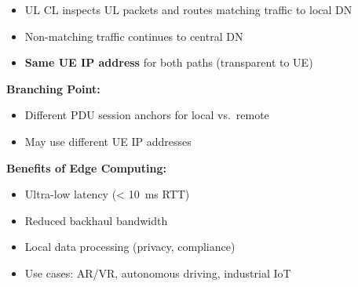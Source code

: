 
\begin{itemize}
\tightlist
\item
  UL CL inspects UL packets and routes matching traffic to local DN
\item
  Non-matching traffic continues to central DN
\item
  \textbf{Same UE IP address} for both paths (transparent to UE)
\end{itemize}


\textbf{Branching Point:}


\begin{itemize}
\tightlist
\item
  Different PDU session anchors for local vs. remote
\item
  May use different UE IP addresses
\end{itemize}

\textbf{Benefits of Edge Computing:}

\begin{itemize}
\tightlist
\item
  Ultra-low latency (\textless{} 10~ms RTT)
\item
  Reduced backhaul bandwidth
\item
  Local data processing (privacy, compliance)
\item
  Use cases: AR/\allowbreak{}VR, autonomous driving, industrial IoT
\end{itemize}






